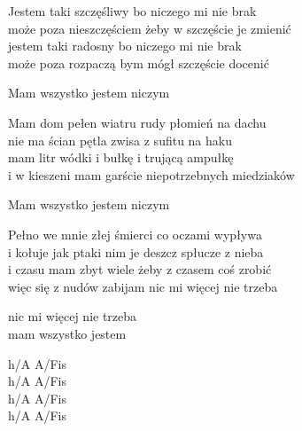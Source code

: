 \begin{text}
    Jestem taki szczęśliwy bo niczego mi nie brak\\
    może poza nieszczęściem żeby w szczęście je zmienić\\
    jestem taki radosny bo niczego mi nie brak\\
    może poza rozpaczą bym mógł szczęście docenić

    Mam wszystko jestem niczym

    Mam dom pełen wiatru rudy płomień na dachu\\
    nie ma ścian pętla zwisa z sufitu na haku\\
    mam litr wódki i bułkę i trującą ampułkę\\
    i w kieszeni mam garście niepotrzebnych miedziaków

    Mam wszystko jestem niczym

    Pełno we mnie złej śmierci co oczami wypływa\\
    i kołuje jak ptaki nim je deszcz spłucze z nieba\\
    i czasu mam zbyt wiele żeby z czasem coś zrobić\\
    więc się z nudów zabijam nic mi więcej nie trzeba

    nic mi więcej nie trzeba\\
    mam wszystko jestem
\end{text}
\begin{chord}
    h/A A/Fis\\
    h/A A/Fis\\
    h/A A/Fis\\
    h/A A/Fis
\end{chord}
